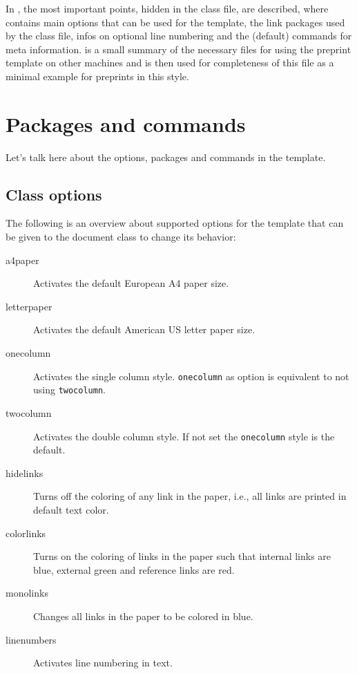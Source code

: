 \documentclass[%
  a4paper,
  twocolumn,
  colorlinks,
]{preprint}
\begin{document}
In , the most important points, hidden in the class file, are
described, where  contains main options that can be used
for the template,  the link packages used by the
class file,  infos on optional line numbering and
 the (default) commands for meta information.
 is a small summary of the necessary files for using the
preprint template on other machines and  is then used for
completeness of this file as a minimal example for preprints in this style.



\section{Packages and commands}%
\label{sec:pkgcmd}

Let's talk here about the options, packages and commands in the template.


\subsection{Class options}%
\label{subsec:options}

The following is an overview about supported options for the template that can
be given to the document class to change its behavior:

\begin{description}
  \item[a4paper] Activates the default European A4 paper size.
  \item[letterpaper] Activates the default American US letter paper size.
  \item[onecolumn] Activates the single column style. \texttt{onecolumn}
    as option is equivalent to not using \texttt{twocolumn}.
  \item[twocolumn] Activates the double column style. If not set the
    \texttt{onecolumn} style is the default.
  \item[hidelinks] Turns off the coloring of any link in the paper, i.e., all
    links are printed in default text color.
  \item[colorlinks] Turns on the coloring of links in the paper such that
    internal links are blue, external green and reference links are red.
  \item[monolinks] Changes all links in the paper to be colored in blue.
  \item[linenumbers] Activates line numbering in text.
\end{description}
\end{document}

